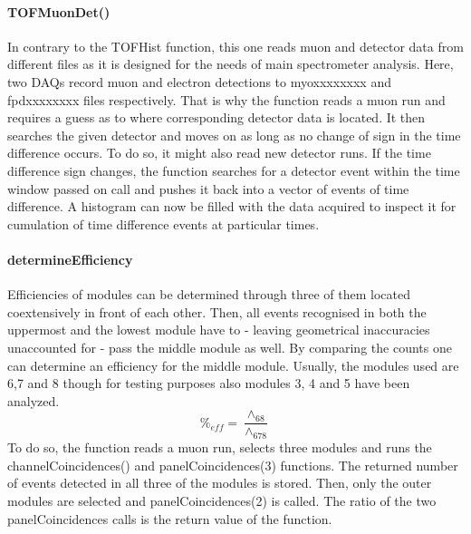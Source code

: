     \paragraph{TOFMuonDet()}
    \label{ch:Analysis software:sec:methods of the class run:subsec:TOFMuonDet()}
    
    In contrary to the TOFHist function, this one reads muon and detector data from different files as it is designed for the needs of main spectrometer analysis. Here, two DAQs record muon and electron detections to myoxxxxxxxx and fpdxxxxxxxx files respectively. That is why the function reads a muon run and requires a guess as to where corresponding detector data is located. It then searches the given detector and moves on as long as no change of sign in the time difference occurs. To do so, it might also read new detector runs. If the time difference sign changes, the function searches for a detector event within the time window passed on call and pushes it back into a vector of events of time difference. 
    A histogram can now be filled with the data acquired to inspect it for cumulation of time difference events at particular times.
    
    \paragraph{determineEfficiency}
    \label{ch:Analysis software:sec:methods of the class run:subsec:determineEfficiency}
    
    Efficiencies of modules can be determined through three of them located coextensively in front of each other. Then, all events recognised in both the uppermost and the lowest module have to - leaving geometrical inaccuracies unaccounted for - pass the middle module as well. By comparing the counts one can determine an efficiency for the middle module. Usually, the modules used are 6,7 and 8 though for testing purposes also modules 3, 4 and 5 have been analyzed. 
    \begin{equation}
    	\%_{eff} = \frac{\wedge_{68}}{{\wedge_{678}}}
    \end{equation}
    To do so, the function reads a muon run, selects three modules and runs the channelCoincidences() and panelCoincidences(3) functions. The returned number of events detected in all three of the modules is stored. Then, only the outer modules are selected and panelCoincidences(2) is called. The ratio of the two panelCoincidences calls is the return value of the function.
    
